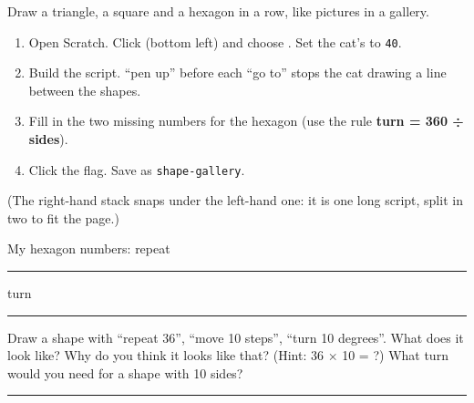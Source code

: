 \namedateline

\begin{core}
Draw a triangle, a square and a hexagon in a row, like pictures in a gallery.
\begin{enumerate}[leftmargin=1.4em,itemsep=1pt]
  \item Open Scratch. Click  (bottom left) and choose . Set the cat's  to \texttt{40}.
  \item Build the script. \enquote{pen up} before each \enquote{go to} stops the cat drawing a line between the shapes.
  \item Fill in the two missing numbers for the hexagon (use the rule \textbf{turn = 360 ÷ sides}).
  \item Click the flag. Save as \texttt{shape-gallery}.
\end{enumerate}
\begin{center}
\begin{scratch}[scale=0.72]
\end{scratch}
\hspace{0.6cm}
\begin{scratch}[scale=0.72]
\end{scratch}
\end{center}
{\small (The right-hand stack snaps under the left-hand one: it is one long script, split in two to fit the page.)}

My hexagon numbers: repeat \rule{1.5cm}{0.4pt} \quad turn \rule{1.5cm}{0.4pt}
\end{core}

\begin{challenge}
Draw a shape with \enquote{repeat 36}, \enquote{move 10 steps}, \enquote{turn 10 degrees}. What does it look like? Why do you think it looks like that? (Hint: 36 × 10 = ?)
What turn would you need for a shape with 10 sides? \rule{2cm}{0.4pt}
\end{challenge}

